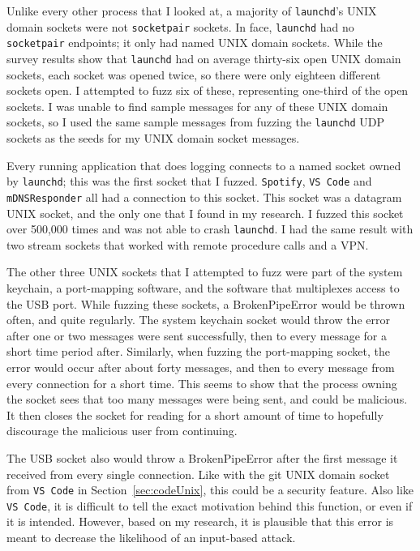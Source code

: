 Unlike every other process that I looked at, a majority of \texttt{launchd}'s UNIX domain sockets were not \texttt{socketpair} sockets.  In face, \texttt{launchd} had no \texttt{socketpair} endpoints; it only had named UNIX domain sockets.  While the survey results show that \texttt{launchd} had on average thirty-six open UNIX domain sockets, each socket was opened twice, so there were only eighteen different sockets open.  I attempted to fuzz six of these, representing one-third of the open sockets.  I was unable to find sample messages for any of these UNIX domain sockets, so I used the same sample messages from fuzzing the \texttt{launchd} UDP sockets as the seeds for my UNIX domain socket messages.

Every running application that does logging connects to a named socket owned by \texttt{launchd}; this was the first socket that I fuzzed.  \texttt{Spotify}, \texttt{VS Code} and \texttt{mDNSResponder} all had a connection to this socket.  This socket was a datagram UNIX socket, and the only one that I found in my research.  I fuzzed this socket over 500,000 times and was not able to crash \texttt{launchd}.  I had the same result with two stream sockets that worked with remote procedure calls and a VPN.

The other three UNIX sockets that I attempted to fuzz were part of the system keychain, a port-mapping software, and the software that multiplexes access to the USB port.  While fuzzing these sockets, a BrokenPipeError would be thrown often, and quite regularly.  The system keychain socket would throw the error after one or two messages were sent successfully, then to every message for a short time period after.  Similarly, when fuzzing the port-mapping socket, the error would occur after about forty messages, and then to every message from every connection for a short time.  This seems to show that the process owning the socket sees that too many messages were being sent, and could be malicious.  It then closes the socket for reading for a short amount of time to hopefully discourage the malicious user from continuing.

The USB socket also would throw a BrokenPipeError after the first message it received from every single connection.  Like with the git UNIX domain socket from \texttt{VS Code} in Section~\ref{sec:codeUnix}, this could be a security feature.  Also like \texttt{VS Code}, it is difficult to tell the exact motivation behind this function, or even if it is intended.  However, based on my research, it is plausible that this error is meant to decrease the likelihood of an input-based attack.

